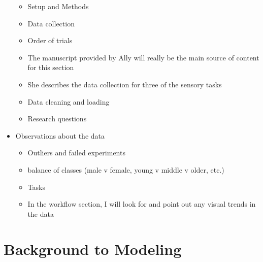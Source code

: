 \documentclass[
]{article}
\providecommand{\tightlist}{%
  \setlength{\itemsep}{0pt}\setlength{\parskip}{0pt}}
\begin{document}
\begin{itemize}
  \begin{itemize}
  \tightlist
  \item
    Setup and Methods
  \item
    Data collection
  \item
    Order of trials
  \item
    The manuscript provided by Ally will really be the main source of content for this section
  \item
    She describes the data collection for three of the sensory tasks
  \item
    Data cleaning and loading
  \item
    Research questions
  \end{itemize}
\item
  Observations about the data

  \begin{itemize}
  \tightlist
  \item
    Outliers and failed experiments
  \item
    balance of classes (male v female, young v middle v older, etc.)
  \item
    Tasks
  \item
    In the workflow section, I will look for and point out any visual trends in the data
  \end{itemize}
\end{itemize}

\hypertarget{background}{%
\section{Background to Modeling}\label{background}}
\end{document}
